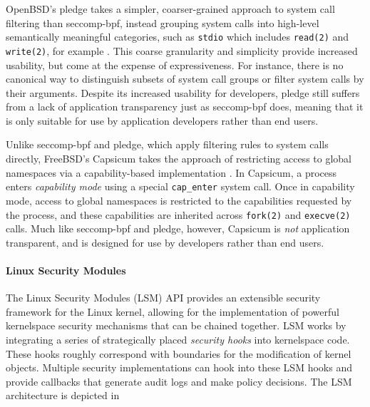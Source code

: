 \documentclass[dvipsnames, 12pt]{article}
\begin{document}
OpenBSD's pledge \cite{pledge} takes a simpler, coarser-grained approach to
system call filtering than seccomp-bpf, instead grouping system calls into
high-level semantically meaningful categories, such as \texttt{stdio} which
includes \texttt{read(2)} and \texttt{write(2)}, for example
\cite{anderson2017_comparison}. This coarse granularity and simplicity provide
increased usability, but come at the expense of expressiveness. For instance,
there is no canonical way to distinguish subsets of system call groups or filter
system calls by their arguments.  Despite its increased usability for
developers, pledge still suffers from a lack of application transparency just as
seccomp-bpf does, meaning that it is only suitable for use by application
developers rather than end users.

Unlike seccomp-bpf and pledge, which apply filtering rules to system calls
directly, FreeBSD's Capsicum takes the approach of restricting access to global
namespaces via a capability-based implementation \cite{watson2010_capsicum}. In
Capsicum, a process enters \textit{capability mode}  using a special
\texttt{cap\_enter} system call. Once in capability mode, access to global
namespaces is restricted to the capabilities requested by the process, and these
capabilities are inherited across \texttt{fork(2)} and \texttt{execve(2)} calls.
Much like seccomp-bpf and pledge, however, Capsicum is \textit{not} application
transparent, and is designed for use by developers rather than end users.

\paragraph*{Linux Security Modules}
The Linux Security Modules (LSM) API \cite{wright2002_lsm} provides an
extensible security framework for the Linux kernel, allowing for the
implementation of powerful kernelspace security mechanisms that can be chained
together. LSM works by integrating a series of strategically placed
\textit{security hooks} into kernelspace code. These hooks roughly correspond
with boundaries for the modification of kernel objects. Multiple security
implementations can hook into these LSM hooks and provide callbacks that
generate audit logs and make policy decisions. The LSM architecture is
depicted in 
\end{document}
